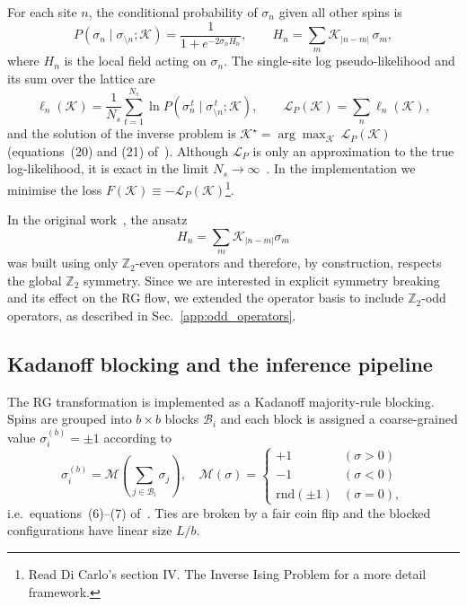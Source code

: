 \documentclass[a4paper, 11pt]{article}
\begin{document}
For each site $n$, the conditional probability of $\sigma_n$ given all other spins is \cite{blocking}
\begin{equation}
  P(\sigma_n \mid \sigma_{\setminus n}; \mathcal{K}) =
  \frac{1}{1 + e^{-2\sigma_n H_n}}, \qquad
  H_n = \sum_m \mathcal{K}_{|n-m|}\,\sigma_m ,
  \label{eq:cond_prob}
\end{equation}
where $H_n$ is the local field acting on $\sigma_n$. The single-site log pseudo-likelihood and its sum over the lattice are
\begin{equation}
  \ell_n(\mathcal{K}) = \frac{1}{N_s}\sum_{t=1}^{N_s}
  \ln P\!\left(\sigma_n^{\,t}\mid \sigma_{\setminus n}^{\,t};\mathcal{K}\right),
  \qquad
  \mathcal{L}_P(\mathcal{K}) = \sum_n \ell_n(\mathcal{K}) ,
  \label{eq:pseudo_likelihood}
\end{equation}
and the solution of the inverse problem is $\mathcal{K}^\star = \arg\max_{\mathcal{K}}\,\mathcal{L}_P(\mathcal{K})$ (equations~(20) and (21) of~\cite{blocking}). Although $\mathcal{L}_P$ is only an approximation to the true log-likelihood, it is exact in the limit $N_s\to\infty$~\cite{blocking}. In the implementation we minimise the loss $F(\mathcal{K}) \equiv -\mathcal{L}_P(\mathcal{K})$\footnote{Read Di Carlo's \cite{blocking} section IV. The Inverse Ising Problem for a more detail framework.}.

In the original work~\cite{blocking}, the ansatz
$$H_n=\sum_m \mathcal{K}_{|n-m|}\sigma_m$$
was built using only $\mathbb{Z}_2$-even operators and therefore, by construction, respects the global $\mathbb{Z}_2$ symmetry. Since we are interested in explicit symmetry breaking and its effect on the RG flow, we extended the operator basis to include $\mathbb{Z}_2$-odd operators, as described in Sec.~\ref{app:odd_operators}.


\subsection{Kadanoff blocking and the inference pipeline}
\label{app:blocking}

The RG transformation is implemented as a Kadanoff majority-rule blocking. Spins are grouped into $b\times b$ blocks $\mathcal{B}_i$ and each block is assigned a coarse-grained value $\sigma^{(b)}_i = \pm1$ according to
\begin{equation}
  \sigma^{(b)}_i = \mathcal{M}\!\left(\sum_{j\in\mathcal{B}_i}\sigma_j\right),
  \quad
  \mathcal{M}(\sigma) = \begin{cases}
    +1  & (\sigma>0)\\
    -1  & (\sigma<0)\\
    \mathrm{rnd}(\pm 1) & (\sigma=0),
  \end{cases}
  \label{eq:majority}
\end{equation}
i.e.\ equations~(6)--(7) of~\cite{blocking}. Ties are broken by a fair coin flip and the blocked configurations have linear size $L/b$.
\end{document}
